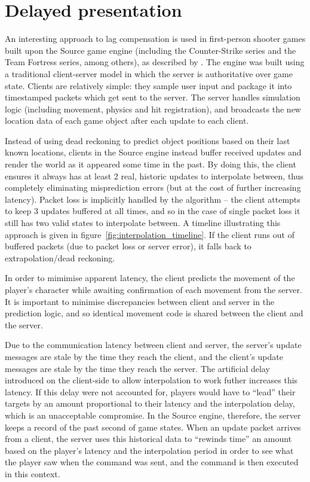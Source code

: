 \documentclass[conference]{IEEEtran}
\begin{document}



	\section{Delayed presentation}
	\label{sec:delayed_presentation}

	An interesting approach to lag compensation is used in first-person shooter games built upon the Source game engine (including the Counter-Strike series and the Team Fortress series, among others), as described by \textcite{bernier2001latency}. The engine was built using a traditional client-server model in which the server is authoritative over game state. Clients are relatively simple: they sample user input and package it into timestamped packets which get sent to the server. The server handles simulation logic (including movement, physics and hit registration), and broadcasts the new location data of each game object after each update to each client.

	Instead of using dead reckoning to predict object positions based on their last known locations, clients in the Source engine instead buffer received updates and render the world as it appeared some time in the past. By doing this, the client ensures it always has at least 2 real, historic updates to interpolate between, thus completely eliminating misprediction errors (but at the cost of further increasing latency). Packet loss is implicitly handled by the algorithm -- the client attempts to keep 3 updates buffered at all times, and so in the case of single packet loss it still has two valid states to interpolate between. A timeline illustrating this approach is given in figure~\ref{fig:interpolation_timeline}. If the client runs out of buffered packets (due to packet loss or server error), it falls back to extrapolation/dead reckoning.

	In order to mimimise apparent latency, the client predicts the movement of the player's character while awaiting confirmation of each movement from the server. It is important to minimise discrepancies between client and server in the prediction logic, and so identical movement code is shared between the client and the server.

	Due to the communication latency between client and server, the server's update messages are stale by the time they reach the client, and the client's update messages are stale by the time they reach the server. The artificial delay introduced on the client-side to allow interpolation to work futher increases this latency. If this delay were not accounted for, players would have to ``lead'' their targets by an amount proportional to their latency and the interpolation delay, which is an unacceptable compromise. In the Source engine, therefore, the server keeps a record of the past second of game states. When an update packet arrives from a client, the server uses this historical data to ``rewinds time'' an amount based on the player's latency and the interpolation period in order to see what the player saw when the command was sent, and the command is then executed in this context.
\end{document}

